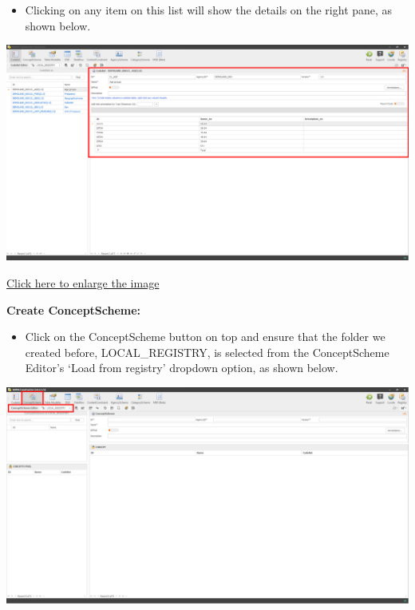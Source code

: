 \documentclass[
]{book}
\providecommand{\tightlist}{%
  \setlength{\itemsep}{0pt}\setlength{\parskip}{0pt}}
\begin{document}
\begin{itemize}
\tightlist
\item
  Clicking on any item on this list will show the details on the right pane, as shown below.
\end{itemize}

\begin{center}\includegraphics[width=1\linewidth]{./images/image098} \end{center}

\href{images/image098.png}{Click here to enlarge the image}

\textbf{Create ConceptScheme:}

\begin{itemize}
\tightlist
\item
  Click on the ConceptScheme button on top and ensure that the folder we created before, LOCAL\_REGISTRY, is selected from the ConceptScheme Editor's `Load from registry' dropdown option, as shown below.
\end{itemize}

\begin{center}\includegraphics[width=1\linewidth]{./images/image100} \end{center}
\end{document}
